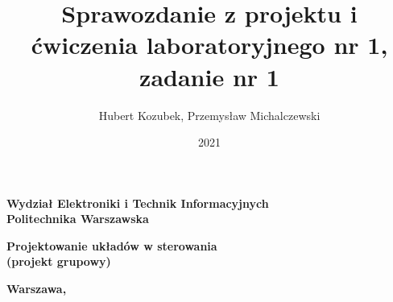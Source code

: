 \documentclass[a4paper,titlepage,11pt,twosides,floatssmall]{mwrep}
\begin{document}
\frenchspacing
\pagestyle{uheadings}

\title{\bf Sprawozdanie z projektu i ćwiczenia laboratoryjnego nr 1, zadanie nr 1\vskip 0.1cm}
\author{Hubert Kozubek, Przemysław Michalczewski}
\date{2021}

\makeatletter
\renewcommand{\maketitle}{\begin{titlepage}
\begin{center}{\LARGE {\bf
Wydział Elektroniki i Technik Informacyjnych}}\\
\vspace{0.4cm}
{\LARGE {\bf Politechnika Warszawska}}\\
\vspace{0.3cm}
\end{center}
\vspace{5cm}
\begin{center}
{\bf \LARGE Projektowanie układów w sterowania\\ (projekt grupowy) \vskip 0.1cm}
\end{center}
\vspace{1cm}
\begin{center}
{\bf \LARGE \@title}
\end{center}
\vspace{2cm}
\begin{center}
{\bf \Large \@author \par}
\end{center}
\vspace*{\stretch{6}}
\begin{center}
\bf{\large{Warszawa, \@date\vskip 0.1cm}}
\end{center}
\end{titlepage}
}
\makeatother

\maketitle

\tableofcontents
\end{document}
